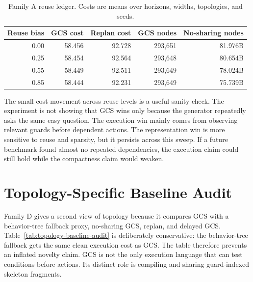\documentclass{article}
\begin{document}
\begin{table}[p]
\centering
\caption{Family A reuse ledger. Costs are means over horizons, widths, topologies, and seeds.}
\label{tab:reuse-ledger}
\small
\begin{tabular}{rrrrr}
\toprule
Reuse bias & GCS cost & Replan cost & GCS nodes & No-sharing nodes\\
\midrule
0.00 & 58.456 & 92.728 & 293{,}651 & 81.976B\\
0.25 & 58.454 & 92.564 & 293{,}648 & 80.654B\\
0.55 & 58.449 & 92.511 & 293{,}649 & 78.024B\\
0.85 & 58.444 & 92.231 & 293{,}649 & 75.739B\\
\bottomrule
\end{tabular}
\end{table}

The small cost movement across reuse levels is a useful sanity check. The experiment is not showing that GCS wins only because the generator repeatedly asks the same easy question. The execution win mainly comes from observing relevant guards before dependent actions. The representation win is more sensitive to reuse and sparsity, but it persists across this sweep. If a future benchmark found almost no repeated dependencies, the execution claim could still hold while the compactness claim would weaken.

\section{Topology-Specific Baseline Audit}
Family D gives a second view of topology because it compares GCS with a behavior-tree fallback proxy, no-sharing GCS, replan, and delayed GCS. Table~\ref{tab:topology-baseline-audit} is deliberately conservative: the behavior-tree fallback gets the same clean execution cost as GCS. The table therefore prevents an inflated novelty claim. GCS is not the only execution language that can test conditions before actions. Its distinct role is compiling and sharing guard-indexed skeleton fragments.
\end{document}
